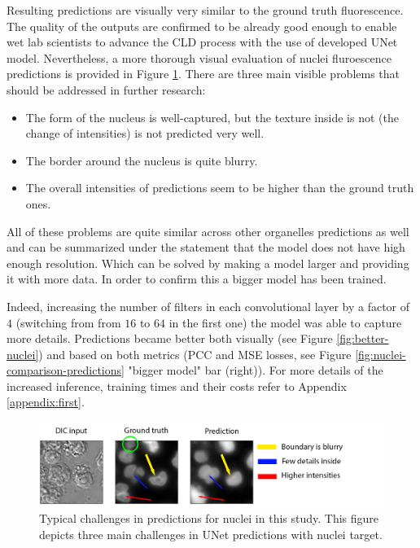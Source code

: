 Resulting predictions are visually very similar to the ground truth fluorescence. The quality of the outputs are confirmed to be already good enough to enable wet lab scientists to advance the CLD process with the use of developed UNet model. Nevertheless, a more thorough visual evaluation of nuclei fluroescence predictions is provided in Figure \ref{fig:nuclei-troubles}. There are three main visible problems that should be addressed in further research:
\begin{itemize}
	\item The form of the nucleus is well-captured, but the texture inside is not (the change of intensities) is not predicted very well.
	\item The border around the nucleus is quite blurry.
	\item The overall intensities of predictions seem to be higher than the ground truth ones.
\end{itemize}

All of these problems are quite similar across other organelles predictions as well and can be summarized under the statement that the model does not have high enough resolution. Which can be solved by making a model larger and providing it with more data. In order to confirm this a bigger model has been trained.

Indeed, increasing the number of filters in each convolutional layer by a factor of $4$ (switching from from $16$ to $64$ in the first one) the model was able to capture more details. Predictions became better both visually (see Figure \ref{fig:better-nuclei}) and based on both metrics (PCC and MSE losses, see Figure \ref{fig:nuclei-comparison-predictions} "bigger model" bar (right)). For more details of the increased inference, training times and their costs refer to Appendix \ref{appendix:first}.

\begin{figure}[htb]
	\begin{center}
		\includegraphics[width=\linewidth]{bilder/nuclei/problems.png}
		\caption[Typical challenges in predictions for nuclei in this study]%
		{Typical challenges in predictions for nuclei in this study. This figure depicts three main challenges in UNet predictions with nuclei target.}\label{fig:nuclei-troubles}
	\end{center}
\end{figure}

